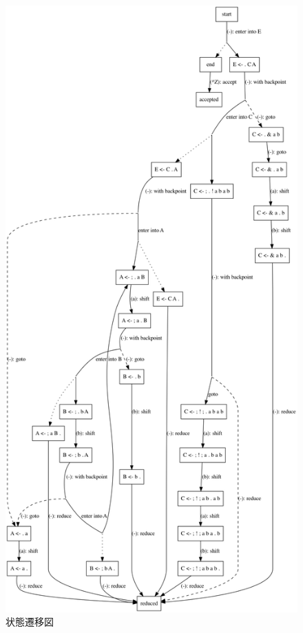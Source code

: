 \begin{figure}
  \centering
  \includegraphics[height=0.9\textheight]{asset/implementation-note-of-peg-parser/sample-grammar.png}
  \caption{状態遷移図}
  \label{implementation-note-of-peg-parser:figure:example}
\end{figure}

